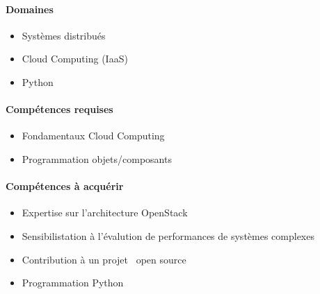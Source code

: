 \documentclass[a4paper,11pt]{article}
\begin{document}
\begin{note}


\paragraph*{Domaines}

\begin{itemize}
 \item Systèmes distribués
 \item Cloud Computing (IaaS)
 \item Python
\end{itemize}

\paragraph*{Compétences requises}

\begin{itemize}
 \item Fondamentaux Cloud Computing
 \item Programmation objets/composants
\end{itemize}

\paragraph*{Compétences à acquérir}

\begin{itemize}
\item Expertise sur l'architecture OpenStack
\item Sensibilistation à l'évalution de performances de systèmes complexes
\item Contribution à un projet \og~open source~\fg
\item Programmation Python
\end{itemize}


\end{note}
\end{document}
